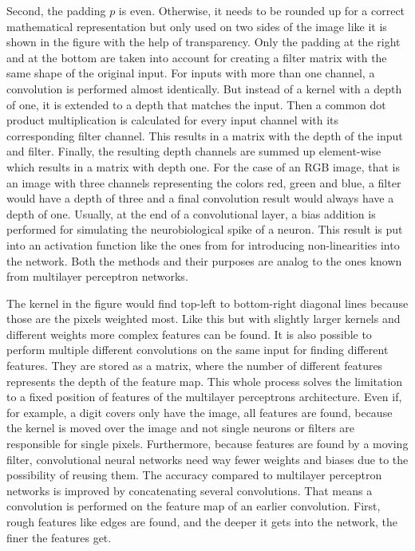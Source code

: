 Second, the padding $p$ is even.
Otherwise, it needs to be rounded up for a correct mathematical representation but only used on two sides of the image like it is shown in the figure with the help of transparency.
Only the padding at the right and at the bottom are taken into account for creating a filter matrix with the same shape of the original input.
For inputs with more than one channel, a convolution is performed almost identically.
But instead of a kernel with a depth of one, it is extended to a depth that matches the input.
Then a common dot product multiplication is calculated for every input channel with its corresponding filter channel.
This results in a matrix with the depth of the input and filter.
Finally, the resulting depth channels are summed up element-wise which results in a matrix with depth one.
For the case of an RGB image, that is an image with three channels representing the colors red, green and blue, a filter would have a depth of three and a final convolution result would always have a depth of one.
Usually, at the end of a convolutional layer, a bias addition is performed for simulating the neurobiological spike of a neuron.
This result is put into an activation function like the ones from  for introducing non-linearities into the network.
Both the methods and their purposes are analog to the ones known from multilayer perceptron networks.

The kernel in the figure would find top-left to bottom-right diagonal lines because those are the pixels weighted most.
Like this but with slightly larger kernels and different weights more complex features can be found.
It is also possible to perform multiple different convolutions on the same input for finding different features.
They are stored as a matrix, where the number of different features represents the depth of the feature map.
This whole process solves the limitation to a fixed position of features of the multilayer perceptrons architecture.
Even if, for example, a digit covers only have the image, all features are found, because the kernel is moved over the image and not single neurons or filters are responsible for single pixels.
Furthermore, because features are found by a moving filter, convolutional neural networks need way fewer weights and biases due to the possibility of reusing them.
The accuracy compared to multilayer perceptron networks is improved by concatenating several convolutions.
That means a convolution is performed on the feature map of an earlier convolution.
First, rough features like edges are found, and the deeper it gets into the network, the finer the features get.